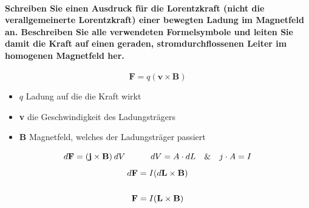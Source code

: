 \documentclass[a4paper, 11pt, ngerman, parskip=half-]{scrartcl}
\begin{document}
\paragraph{Schreiben Sie einen Ausdruck für die Lorentzkraft (nicht die verallgemeinerte
    Lorentzkraft) einer bewegten Ladung im Magnetfeld an. Beschreiben Sie alle verwendeten Formelsymbole
    und leiten Sie damit die Kraft auf einen geraden, stromdurchflossenen Leiter im homogenen Magnetfeld
    her.}
\begin{equation}
    \textbf{F} = q(\textbf{v} \times \textbf{B})
\end{equation}
\begin{itemize}
    \item $q$ Ladung auf die die Kraft wirkt
    \item \textbf{v} die Geschwindigkeit des Ladungsträgers
    \item \textbf{B} Magnetfeld, welches der Ladungsträger passiert
\end{itemize}
\begin{equation}
    d\textbf{F} = (\textbf{j} \times \textbf{B})\hspace{0.2em} dV \hspace{3em} dV = A\cdot dL \hspace{1em}\& \hspace{1em} j \cdot A = I
\end{equation}
\begin{align}
    d\textbf{F} & = I (d\textbf{L} \times \textbf{B}) \\
    \notag                                            \\
    \textbf{F}  & = I (\textbf{L} \times \textbf{B})
\end{align}
\end{document}
